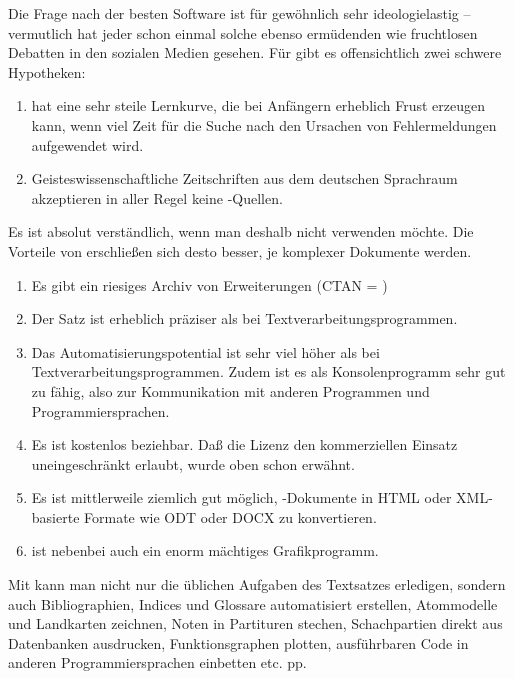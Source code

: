 \documentclass[
	11pt,        %
	table,       %
	twoside,     %
	notitlepage, %
]{scrreprt}
\begin{document}
Die Frage nach der besten Software ist für gewöhnlich sehr ideologielastig -- vermutlich hat jeder schon  einmal solche ebenso ermüdenden wie fruchtlosen Debatten in den sozialen Medien gesehen. Für \LaTeXi{} gibt es offensichtlich zwei schwere Hypotheken:
\begin{enumerate}
\item \LaTeXi{} hat eine sehr steile Lernkurve, die bei Anfängern erheblich Frust erzeugen kann, wenn viel Zeit für die Suche nach den Ursachen von Fehlermeldungen aufgewendet wird.
\item Geisteswissenschaftliche Zeitschriften aus dem deutschen Sprachraum akzeptieren in aller Regel keine \LaTeXi-Quellen.
\end{enumerate}
Es ist absolut verständlich, wenn man deshalb \LaTeXi{} nicht verwenden möchte. Die Vorteile von \LaTeXi{} erschließen sich desto besser, je komplexer Dokumente werden.
\begin{enumerate}
\item Es gibt ein riesiges Archiv von Erweiterungen (CTAN = )
\item Der Satz ist erheblich präziser als bei Textverarbeitungsprogrammen.
\item Das Automatisierungspotential ist sehr viel höher als bei Textverarbeitungsprogrammen. Zudem ist es als Konsolenprogramm sehr gut zu  fähig, also zur Kommunikation mit anderen Programmen und Programmiersprachen.
\item Es ist kostenlos beziehbar. Daß die Lizenz den kommerziellen Einsatz uneingeschränkt erlaubt, wurde oben schon erwähnt.
\item Es ist mittlerweile ziemlich gut möglich, \LaTeXi-Dokumente in HTML oder XML-basierte Formate wie ODT oder DOCX zu konvertieren.
\item \LaTeXi{} ist nebenbei auch ein enorm mächtiges Grafikprogramm.
\end{enumerate}

Mit \LaTeXi{} kann man nicht nur die üblichen Aufgaben des Textsatzes erledigen, sondern auch Bibliographien, Indices und Glossare automatisiert erstellen, Atommodelle und Landkarten zeichnen, Noten in Partituren stechen, Schachpartien direkt aus Datenbanken ausdrucken, Funktionsgraphen plotten, ausführbaren Code in anderen Programmiersprachen einbetten etc. pp.
\end{document}
